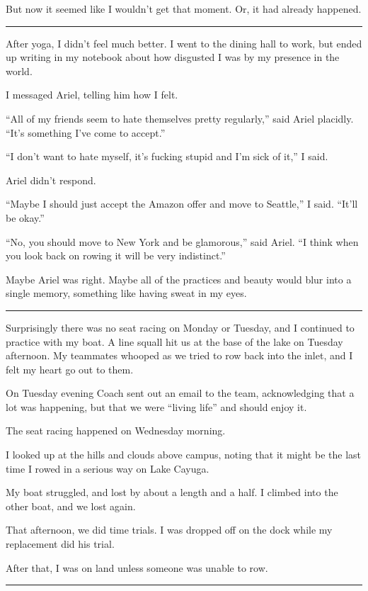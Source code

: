But now it seemed like I wouldn't get that moment.  Or, it had already happened.

\plainfancybreak{12pt}{2}{}

After yoga, I didn't feel much better.  I went to the dining hall to work, but
ended up writing in my notebook about how disgusted I was by my presence in the
world.

I messaged Ariel, telling him how I felt.

``All of my friends seem to hate themselves pretty regularly,'' said Ariel
placidly.  ``It's something I've come to accept.''

``I don't want to hate myself, it's fucking stupid and I'm sick of it,'' I said.  

Ariel didn't respond.

``Maybe I should just accept the Amazon offer and move to Seattle,'' I said.
``It'll be okay.''

``No, you should move to New York and be glamorous,'' said Ariel.  ``I think
when you look back on rowing it will be very indistinct.'' 

Maybe Ariel was right.  Maybe all of the practices and beauty would blur into a
single memory, something like having sweat in my eyes. 

\plainfancybreak{12pt}{2}{}

Surprisingly there was no seat racing on Monday or Tuesday, and I continued to
practice with my boat.  A line squall hit us at the base of the lake on Tuesday
afternoon.  My teammates whooped as we tried to row back into the inlet, and I
felt my heart go out to them.

On Tuesday evening Coach sent out an email to the team, acknowledging that a lot
was happening, but that we were ``living life'' and should enjoy it.

The seat racing happened on Wednesday morning.  

I looked up at the hills and clouds above campus, noting that it might be the
last time I rowed in a serious way on Lake Cayuga.

My boat struggled, and lost by about a length and a half.  I climbed into the
other boat, and we lost again.

That afternoon, we did time trials.  I was dropped off on the dock while my
replacement did his trial. 

After that, I was on land unless someone was unable to row.
 
\plainfancybreak{12pt}{2}{}

